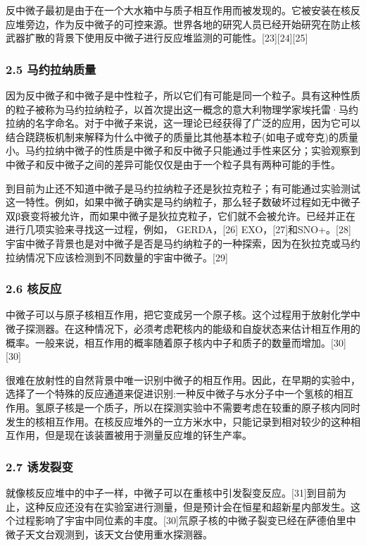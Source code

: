 反中微子最初是由于在一个大水箱中与质子相互作用而被发现的。它被安装在核反应堆旁边，作为反中微子的可控来源。世界各地的研究人员已经开始研究在防止核武器扩散的背景下使用反中微子进行反应堆监测的可能性。[23][24][25]

\subsubsection{2.5 马约拉纳质量}
因为反中微子和中微子是中性粒子，所以它们有可能是同一个粒子。具有这种性质的粒子被称为马约拉纳粒子，以首次提出这一概念的意大利物理学家埃托雷·马约拉纳的名字命名。对于中微子来说，这一理论已经获得了广泛的应用，因为它可以结合跷跷板机制来解释为什么中微子的质量比其他基本粒子(如电子或夸克)的质量小。马约拉纳中微子的性质是中微子和反中微子只能通过手性来区分；实验观察到中微子和反中微子之间的差异可能仅仅是由于一个粒子具有两种可能的手性。

到目前为止还不知道中微子是马约拉纳粒子还是狄拉克粒子；有可能通过实验测试这一特性。例如，如果中微子确实是马约纳粒子，那么轻子数破坏过程如无中微子双β衰变将被允许，而如果中微子是狄拉克粒子，它们就不会被允许。已经并正在进行几项实验来寻找这一过程，例如， GERDA，[26] EXO，[27]和SNO+。[28]宇宙中微子背景也是对中微子是否是马约纳粒子的一种探索，因为在狄拉克或马约拉纳情况下应该检测到不同数量的宇宙中微子。[29]

\subsubsection{2.6 核反应}
中微子可以与原子核相互作用，把它变成另一个原子核。这个过程用于放射化学中微子探测器。在这种情况下，必须考虑靶核内的能级和自旋状态来估计相互作用的概率。一般来说，相互作用的概率随着原子核内中子和质子的数量而增加。[30][30]

很难在放射性的自然背景中唯一识别中微子的相互作用。因此，在早期的实验中，选择了一个特殊的反应通道来促进识别:一种反中微子与水分子中一个氢核的相互作用。氢原子核是一个质子，所以在探测实验中不需要考虑在较重的原子核内同时发生的核相互作用。在核反应堆外的一立方米水中，只能记录到相对较少的这种相互作用，但是现在该装置被用于测量反应堆的钚生产率。

\subsubsection{2.7 诱发裂变}
就像核反应堆中的中子一样，中微子可以在重核中引发裂变反应。[31]到目前为止，这种反应还没有在实验室进行测量，但是预计会在恒星和超新星内部发生。这个过程影响了宇宙中同位素的丰度。[30]氘原子核的中微子裂变已经在萨德伯里中微子天文台观测到，该天文台使用重水探测器。

